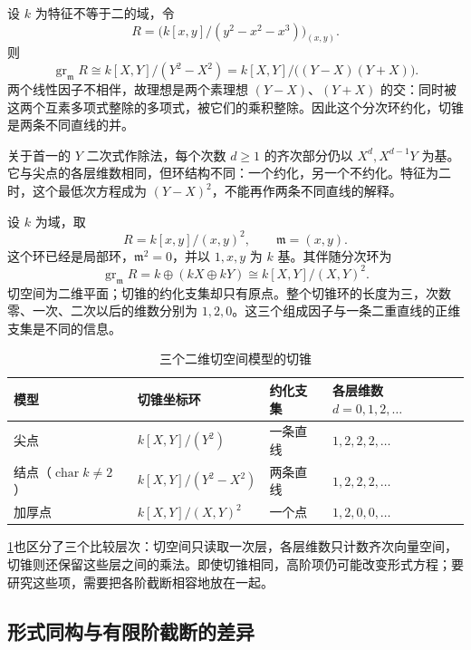 \begin{example}
\label{g5:exm:node-tangent-cone}
	设 \(k\) 为特征不等于二的域，令
	\[
		R=\bigl(k[x,y]/(y^2-x^2-x^3)\bigr)_{(x,y)}.
	\]
	则
	\[
		\operatorname{gr}_{\mathfrak m}R
		\cong k[X,Y]/(Y^2-X^2)
		=k[X,Y]/\bigl((Y-X)(Y+X)\bigr).
	\]
	两个线性因子不相伴，故理想是两个素理想 \((Y-X)\)、\((Y+X)\) 的交：同时被这两个互素多项式整除的多项式，被它们的乘积整除。因此这个分次环约化，切锥是两条不同直线的并。

	关于首一的 \(Y\) 二次式作除法，每个次数 \(d\geq1\) 的齐次部分仍以 \(X^d,X^{d-1}Y\) 为基。它与尖点的各层维数相同，但环结构不同：一个约化，另一个不约化。特征为二时，这个最低次方程成为 \((Y-X)^2\)，不能再作两条不同直线的解释。
\end{example}

\begin{example}
\label{g5:exm:thick-point-tangent-cone}
	设 \(k\) 为域，取
	\[
		R=k[x,y]/(x,y)^2,\qquad \mathfrak m=(x,y).
	\]
	这个环已经是局部环，\(\mathfrak m^2=0\)，并以 \(1,x,y\) 为 \(k\) 基。其伴随分次环为
	\[
		\operatorname{gr}_{\mathfrak m}R
		=k\oplus(kX\oplus kY)
		\cong k[X,Y]/(X,Y)^2.
	\]
	切空间为二维平面；切锥的约化支集却只有原点。整个切锥环的长度为三，次数零、一次、二次以后的维数分别为 \(1,2,0\)。这三个组成因子与一条二重直线的正维支集是不同的信息。
\end{example}

\begin{table}[htbp]
	\centering
	\caption{三个二维切空间模型的切锥}
	\label{g5:tab:tangent-cone-models}
	\begin{tabular}{llll}
		\toprule
		模型 & 切锥坐标环 & 约化支集 & 各层维数 \(d=0,1,2,\ldots\) \\
		\midrule
		尖点 & \(k[X,Y]/(Y^2)\) & 一条直线 & \(1,2,2,2,\ldots\) \\
		结点（\(\operatorname{char}k\ne2\)） & \(k[X,Y]/(Y^2-X^2)\) & 两条直线 & \(1,2,2,2,\ldots\) \\
		加厚点 & \(k[X,Y]/(X,Y)^2\) & 一个点 & \(1,2,0,0,\ldots\) \\
		\bottomrule
	\end{tabular}
\end{table}

\cref{g5:tab:tangent-cone-models}也区分了三个比较层次：切空间只读取一次层，各层维数只计数齐次向量空间，切锥则还保留这些层之间的乘法。即使切锥相同，高阶项仍可能改变形式方程；要研究这些项，需要把各阶截断相容地放在一起。

\subsection{形式同构与有限阶截断的差异}
\label{g5:subsec:0504:04}

